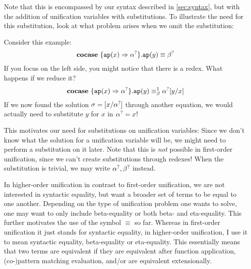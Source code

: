 \documentclass[twoside,12pt,a4paper]{article}
\begin{document}
Note that this is encompassed by our syntax described in \cref{sec:syntax},
but with the addition of unification variables with substitutions. 
To illustrate the need for this substitution, look at what problem arises when we omit the substitution:
\begin{example} 
    Consider this example:
    \begin{align*}
        \textbf{cocase}\ \{\texttt{ap}(x)\Rightarrow\alpha^?\}.\texttt{ap}(y)\equiv\beta^?
    \end{align*}
    If you focus on the left side, you might notice that there is a redex. What happens if we reduce it?
    \begin{align*}
        \textbf{cocase}\ \{\texttt{ap}(x)\Rightarrow\alpha^?\}.\texttt{ap}(y)\equiv_{\beta}^1\alpha^?[y/x]    
    \end{align*}     
    If we now found the solution $\sigma = [x/ \alpha^?]$ through another equation, we would actually need to substitute $y$ for $x$ in $\alpha^? = x$!
\end{example}

This motivates our need for substitutions on unification variables: 
Since we don't know what the solution for a unification variable will be, we might need to perform a substitution on it later.
Note that this is \textit{not} possible in first-order unification, since we can't create substitutions through redexes! 
When the substitution is trivial, we may  write $\alpha^?, \beta^?$ instead.

In higher-order unification in contrast to first-order unification, we are not interested in syntactic equality, but want a broader set of terms to be equal to one another.
Depending on the type of unification problem one wants to solve, one may want to only include beta-equality or both beta- and eta-equality.
This further motivates the use of the symbol $\equiv$ so far. Whereas in first-order unification it just stands for syntactic equality, 
in higher-order unification, I use it to mean syntactic equality, beta-equality or eta-equality.
This essentially means that two terms are equivalent if they are equivalent after function application, (co-)pattern matching evaluation, and/or are equivalent extensionally.
\end{document}
